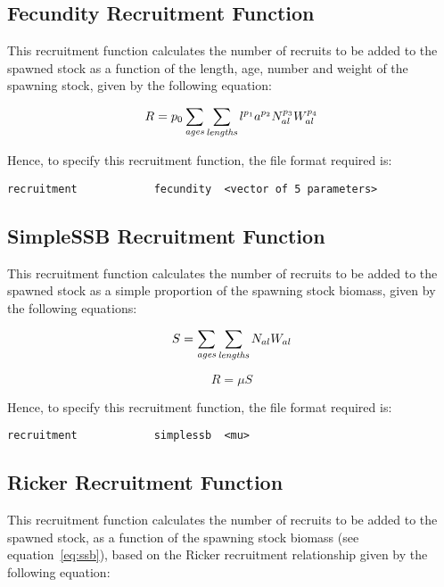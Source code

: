 \documentclass[10pt,twoside]{book}
\begin{document}
\subsection{Fecundity Recruitment Function}
This recruitment function calculates the number of recruits to be added to the spawned stock as a function of the length, age, number and weight of the spawning stock, given by the following equation:

\begin{equation}\label{eq:rec1}
R = p_{0} \sum_{\it ages}\sum_{\it lengths} l ^{p_{1}} a ^{p_{2}} N_{al} ^{p_{3}} W_{al} ^{p_{4}}
\end{equation}

Hence, to specify this recruitment function, the file format required is:

{\small\begin{verbatim}
recruitment            fecundity  <vector of 5 parameters>
\end{verbatim}}

\newpage %
\subsection{SimpleSSB Recruitment Function}
This recruitment function calculates the number of recruits to be added to the spawned stock as a simple proportion of the spawning stock biomass, given by the following equations:

\begin{equation}\label{eq:ssb}
S = \sum_{\it ages}\sum_{\it lengths} N_{al} W_{al}
\end{equation}

\begin{equation}\label{eq:rec2}
R = \mu S
\end{equation}

Hence, to specify this recruitment function, the file format required is:

{\small\begin{verbatim}
recruitment            simplessb  <mu>
\end{verbatim}}

\subsection{Ricker Recruitment Function}
This recruitment function calculates the number of recruits to be added to the spawned stock, as a function of the spawning stock biomass (see equation~\ref{eq:ssb}), based on the Ricker recruitment relationship given by the following equation:
\end{document}
